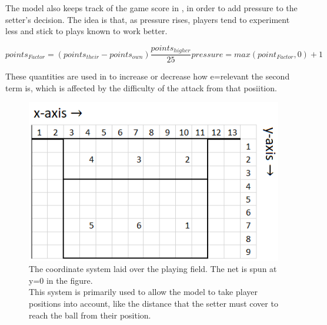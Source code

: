 \documentclass[main.tex]{subfiles}
\begin{document}
      The model also keeps track of the game score in , in order to add pressure to the setter's decision. The idea is that, as pressure rises, players tend to experiment less and stick to plays known to work better.
    
      \begin{subequations}
        \begin{equation}
          points_{Factor}=(points_{their} - points_{own})\frac{points_{higher}}{25} 
          \label{equ:points}
        \end{equation}
        \begin{equation}
          pressure= max( point_{Factor}, 0) + 1      
          \label{equ:pressure}
        \end{equation}
        \label{equ:score}
      \end{subequations}
      
      These quantities are used in  to increase or decrease how e=relevant the second term is, which is affected by the difficulty of the attack from that posiition.
      
      \begin{figure}
        \centering
        \includegraphics[width=0.35\linewidth]{figures/playingFieldGridLabelled}
        \caption{The coordinate system laid over the playing field. The net is spun at y=0 in the figure. \\
          This system is primarily used to allow the model to take player positions into account, like the distance that the setter must cover to reach the ball from their position.}
        \label{fig:field}
      \end{figure}
    
\end{document}
